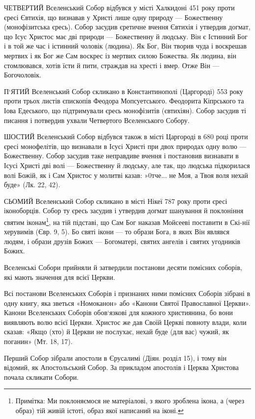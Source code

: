 \documentclass[main.tex]{subfiles}
\begin{document}
ЧЕТВЕРТИЙ Вселенський Собор відбувся у місті Халкидоні 451 року проти єресі Євтихія, що визнавав у Христі лише одну природу — Божественну (монофізитська єресь). Собор засудив єретичне вчення Євтихія і утвердив догмат, що Ісус Христос має дві природи — Божественну й людську. Він є Істинний Бог і в той же час і істинний чоловік (людина). Як Бог, Він творив чуда і воскрешав мертвих і як Бог же Сам воскрес із мертвих силою Божества. Як людина, він стомлювався, хотів їсти й пити, страждав на хресті і вмер. Отже Він — Богочоловік.

П`ЯТИЙ Вселенський Собор скликано в Константинополі (Царгороді) 553 року проти трьох листів єпископів Феодора Мопсуетського. Феодорита Кіпрського та Іова Едеського, що підтримували єресь монофізитів (євтихіян). Собор засудив ті писання і потвердив ухвали Четвертого Вселенського Собору.

ШОСТИЙ Вселенський Собор відбувся також в місті Царгороді в 680 році проти єресі монофелітів, що визнавали в Ісусі Христі при двох природах одну волю — Божественну. Собор засудив таке неправдиве вчення і постановив визнавати в Ісусі Христі дві волі — Божественну й людську, але так, що людська підкорилася волі Божій, як і Сам Христос у молитві казав: »0тче... не Моя, а Твоя воля нехай буде» (Лк. 22, 42).

СЬОМИЙ Вселенський Собор скликано в місті Нікеї 787 року проти єресі іконоборців. Собор ту єресь засудив і утвердив догмат шанування й поклоніння святим іконам\footnote{Примітка: Ми поклоняємося не матеріалові, з якого зроблена ікона, а (через образ) тій живій істоті, образ якої написаний на іконі.}, на тій підставі, що Сам Бог наказав Мойсееві поставити в Скі-нії херувимів (Євр. 9, 5). Бо святі ікони — то образи Бога, в яких Він являвся людям, і образи друзів Божих — Богоматері, святих ангелів і святих угодників Божих.

Вселенські Собори прийняли й затвердили постанови десяти помісних соборів, які мають значення для всієї Церкви.

Всі постанови Вселенських Соборів і признаних ними помісних Соборів зібрані в одну книгу, яка зветься «Номоканон» або «Канони Святої Православної Церкви». Канони Вселенських Соборів обов`язкові для кожного християнина, бо вони виявляють волю всієї Церкви. Христос же дав Своїй Церкві повноту влади, коли сказав: «Якщо (хто) й Церкви не послухає, нехай буде (для вас) чужий, як поганин» (Мт. 18, 17).

Перший Собор зібрали апостоли в Єрусалимі (Діян. розділ 15), і тому він відомий, як Апостольський Собор. За прикладом апостолів і Церква Христова почала скликати Собори.
\end{document}
